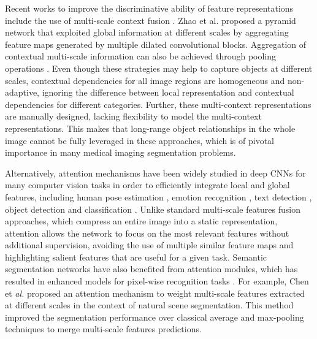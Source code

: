 \documentclass[journal]{IEEEtran}
\begin{document}
Recent works to improve the discriminative ability of feature representations include the use of multi-scale context fusion \cite{chen2018deeplab,zhao2017pyramid,chen2018encoder,yu2015multi}. Zhao et al. \cite{zhao2017pyramid} proposed a pyramid network that exploited global information at different scales by aggregating feature maps generated by multiple dilated convolutional blocks. Aggregation of contextual multi-scale information can also be achieved through pooling operations \cite{liu2015parsenet}. Even though these strategies may help to capture objects at different scales, contextual dependencies for all image regions are homogeneous and non-adaptive, ignoring the difference between local representation and contextual dependencies for different categories. Further, these multi-context representations are manually designed, lacking flexibility to model the multi-context representations. This makes that long-range object relationships in the whole image cannot be fully leveraged in these approaches, which is of pivotal importance in many medical imaging segmentation problems.   













Alternatively, attention mechanisms have been widely studied in deep CNNs for many computer vision tasks in order to efficiently integrate local and global features, including human pose estimation \cite{chu2017multi}, emotion recognition \cite{gupta2018attention}, text detection \cite{huang2019mask}, object detection \cite{chen2018reverse} and classification \cite{li2018tell}. Unlike standard multi-scale features fusion approaches, which compress an entire image into a static representation, attention allows the network to focus on the most relevant features without additional supervision, avoiding the use of multiple similar feature maps and highlighting salient features that are useful for a given task. Semantic segmentation networks have also benefited from attention modules, which has resulted in enhanced models for pixel-wise recognition tasks \cite{chen2016attention,zhao2018psanet,fu2018dual,li2018pyramid,yu2018bisenet,zhang2019deep}. For example, Chen et \textit{al.} \cite{chen2016attention} proposed an attention mechanism to weight multi-scale features extracted at different scales in the context of natural scene segmentation. This method improved the segmentation performance over classical average and max-pooling techniques to merge multi-scale features predictions.
\end{document}
